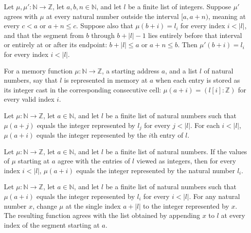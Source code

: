 \begin{theorem}
\label{Light.Seg.of_sameOutside}
\leanok
{}
Let $\mu,\mu' : \mathbb{N}\to\mathbb{Z}$, let $a,b,n\in\mathbb{N}$, and let $l$ be a
finite list of integers. Suppose $\mu'$ agrees with $\mu$ at every natural number
outside the interval $[a,a+n)$, meaning at every $c<a$ or $a+n\le c$. Suppose also that
$\mu(b+i)=l_i$ for every index $i<|l|$, and that the segment from $b$ through $b+|l|-1$
lies entirely before that interval or entirely at or after its endpoint: $b+|l|\le a$ or
$a+n\le b$. Then $\mu'(b+i)=l_i$ for every index $i<|l|$.
\end{theorem}

\begin{definition}
\label{Light.SegN}
\leanok
{}
For a memory function $\mu:\mathbb{N}\to\mathbb{Z}$, a starting address $a$, and a list
$l$ of natural numbers, say that $l$ is represented in memory at $a$ when each entry is
stored as its integer cast in the corresponding consecutive cell:
$\mu(a+i)=(l[i]:\mathbb{Z})$ for every valid index $i$.
\end{definition}

\begin{theorem}
\label{Light.SegN.read}
\leanok
{}
Let $\mu:\mathbb{N}\to\mathbb{Z}$, let $a\in\mathbb{N}$, and let $l$ be a finite list of
natural numbers such that $\mu(a+j)$ equals the integer represented by $l_j$ for every
$j<|l|$. For each $i<|l|$, $\mu(a+i)$ equals the integer represented by the $i$th entry
of $l$.
\end{theorem}

\begin{theorem}
\label{Light.SegN.getElem}
\leanok
{}
Let $\mu : \mathbb{N}\to\mathbb{Z}$, let $a\in\mathbb{N}$, and let $l$ be a finite list
of natural numbers. If the values of $\mu$ starting at $a$ agree with the entries of $l$
viewed as integers, then for every index $i<|l|$, $\mu(a+i)$ equals the integer
represented by the natural number $l_i$.
\end{theorem}

\begin{theorem}
\label{Light.SegN.snoc}
\leanok
{}
Let $\mu:\mathbb{N}\to\mathbb{Z}$, let $a\in\mathbb{N}$, and let $l$ be a finite list of
natural numbers such that $\mu(a+i)$ equals the integer represented by $l_i$ for every
$i<|l|$. For any natural number $x$, change $\mu$ at the single index $a+|l|$ to the
integer represented by $x$. The resulting function agrees with the list obtained by
appending $x$ to $l$ at every index of the segment starting at $a$.
\end{theorem}

